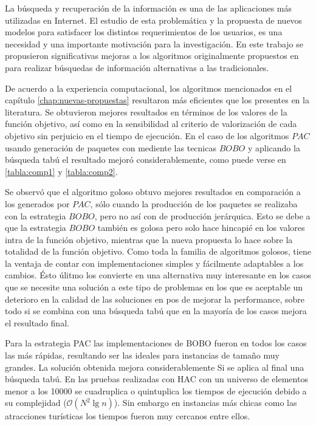 La búsqueda y recuperación de la información es una de las aplicaciones más utilizadas en Internet. El estudio de esta problemática y la propuesta de nuevos modelos para satisfacer los distintos requerimientos de los usuarios, es una necesidad y una importante motivación para la investigación. En este trabajo se propusieron significativas mejoras a los algoritmos originalmente propuestos en \cite{compositeRetrival} para realizar búsquedas de información alternativas a las tradicionales.

De acuerdo a la experiencia computacional, los algoritmos mencionados en el capítulo \autoref{chap:nuevas-propuestas} resultaron más eficientes que los presentes en la literatura. Se obtuvieron mejores resultados en términos de los valores de la función objetivo, así como en la sensibilidad al criterio de valorización de cada objetivo sin perjuicio en el tiempo de ejecución. En el caso de los algoritmos $PAC$ usando generación de paquetes con mediente las tecnicas $BOBO$ y aplicando la búsqueda tabú el resultado mejoró considerablemente, como puede verse en \autoref{tabla:comp1} y \autoref{tabla:comp2}.

Se observó que el algoritmo goloso obtuvo mejores resultados en comparación a los generados por $PAC$, sólo cuando la producción de los paquetes se realizaba con la estrategia $BOBO$, pero no así con de producción jerárquica. Esto se debe a que la estrategia $BOBO$ también es golosa pero solo hace hincapié en los valores intra de la función objetivo, mientras que la nueva propuesta lo hace sobre la totalidad de la función objetivo. Como toda la familia de algoritmos golosos, tiene la ventaja de contar con implementaciones simples y fácilmente adaptables a los cambios. Ésto úlitmo los convierte en una alternativa muy interesante en los casos que se necesite una solución a este tipo de problemas en los que es aceptable un deterioro en la calidad de las soluciones en pos de mejorar la performance, sobre todo si se combina con una búsqueda tabú que en la mayoría de los casos mejora el resultado final.

Para la estrategia PAC las implementaciones de BOBO fueron en todos los casos las más rápidas, resultando ser las ideales para instancias de tamaño muy grandes. La solución obtenida mejora considerablemente Si se aplica al final una búsqueda tabú. En las pruebas realizadas con HAC con un universo de elementos menor a los 10000 se cuadruplica o quintuplica los tiempos de ejecución debido a su complejidad ($\mathcal{O}(N^{2}\lg n)$). Sin embargo en instancias más chicas como las atracciones turísticas los tiempos fueron muy cercanos entre ellos.


